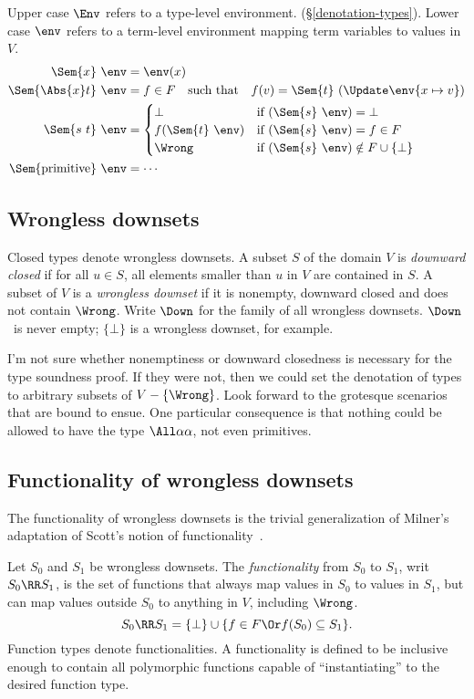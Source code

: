 \documentclass{amsart}
\theoremstyle{definition}
\begin{document}
Upper case $\Env$ refers to a type-level environment.
(\S\ref{denotation-types}). Lower case $\env$ refers to a
term-level environment mapping term variables to values in $V$.
\begin{align*}
\Sem{x}~\env&=\env(x)\\
\Sem{\Abs{x}t}~\env&=
  f\in F\text{\quad such that\quad}
  f(v)=\Sem{t}~(\Update\env{x\mapsto v})
\\
\Sem{s~t}~\env&=
\begin{cases}
\bot&\text{if }(\Sem{s}~\env)=\bot
\\
f(\Sem{t}~\env)&\text{if }(\Sem{s}~\env)=f\in F
\\
\Wrong&\text{if }(\Sem{s}~\env)\notin F\cup\{\bot\}
\end{cases}
\\
\Sem{\mathrm{primitive}}~\env&=\cdots
\end{align*}

\subsection{Wrongless downsets}
\label{wrongless}
Closed types denote wrongless downsets. A subset $S$ of the
domain $V$ is \emph{downward closed} if for all $u\in S$, all
elements smaller than $u$ in $V$ are contained in $S$. A subset
of $V$ is a \emph{wrongless downset} if it is nonempty, downward
closed and does not contain $\Wrong$. Write $\Down$ for the
family of all wrongless downsets. $\Down$~is never empty;
$\{\bot\}$ is a wrongless downset, for example.

I'm not sure whether nonemptiness or downward closedness is
necessary for the type soundness proof. If they were not, then we
could set the denotation of types to arbitrary subsets of
$V-\{\Wrong\}$. Look forward to the grotesque scenarios that are
bound to ensue. One particular consequence is that nothing could
be allowed to have the type $\All\alpha\alpha$, not even
primitives.

\subsection{Functionality of wrongless downsets}
\label{functionality}
The functionality of wrongless down\-sets is the trivial
generalization of Milner's adaptation of Scott's notion of
functionality~\cite{Milner78}.

Let $S_0$ and $S_1$ be wrongless downsets. The
\emph{functionality} from $S_0$ to $S_1$, writ $S_0\RR S_1$, is
the set of functions that always map values in $S_0$ to values in
$S_1$, but can map values outside $S_0$ to anything in $V$,
including $\Wrong$.
\[
S_0 \RR S_1 =
\{\bot\}\cup\{f\in F \Or f(S_0) \subseteq S_1\}.
\]
Function types denote functionalities. A functionality is defined
to be inclusive enough to contain all polymorphic functions
capable of ``instantiating'' to the desired function type.
\end{document}
